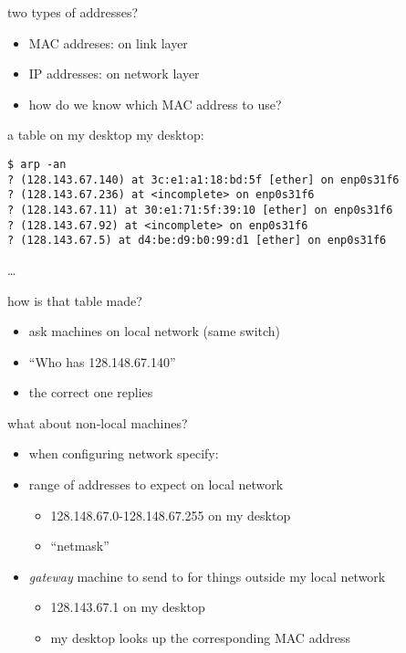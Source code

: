 \begin{frame}{two types of addresses?}
    \begin{itemize}
    \item MAC addreses: on link layer
    \item IP addresses: on network layer
    \vspace{.5cm}
    \item how do we know which MAC address to use?
    \end{itemize}
\end{frame}

\begin{frame}[fragile]{a table on my desktop}
my desktop: \\
\begin{Verbatim}[fontsize=\fontsize{10}{11}\selectfont]
$ arp -an
? (128.143.67.140) at 3c:e1:a1:18:bd:5f [ether] on enp0s31f6
? (128.143.67.236) at <incomplete> on enp0s31f6
? (128.143.67.11) at 30:e1:71:5f:39:10 [ether] on enp0s31f6
? (128.143.67.92) at <incomplete> on enp0s31f6
? (128.143.67.5) at d4:be:d9:b0:99:d1 [ether] on enp0s31f6
\end{Verbatim}
\ldots
\end{frame}

\begin{frame}{how is that table made?}
    \begin{itemize}
    \item ask machines on local network (same switch)
    \item ``Who has 128.148.67.140''
    \item the correct one replies
    \end{itemize}
\end{frame}

\begin{frame}{what about non-local machines?}
    \begin{itemize}
    \item when configuring network specify:
    \vspace{.5cm}
    \item range of addresses to expect on local network 
        \begin{itemize}
        \item 128.148.67.0-128.148.67.255 on my desktop
        \item ``netmask''
        \end{itemize}
    \item \textit{gateway} machine to send to for things outside my local network
        \begin{itemize}
        \item 128.143.67.1 on my desktop
        \item my desktop looks up the corresponding MAC address
        \end{itemize}
    \end{itemize}
\end{frame}

